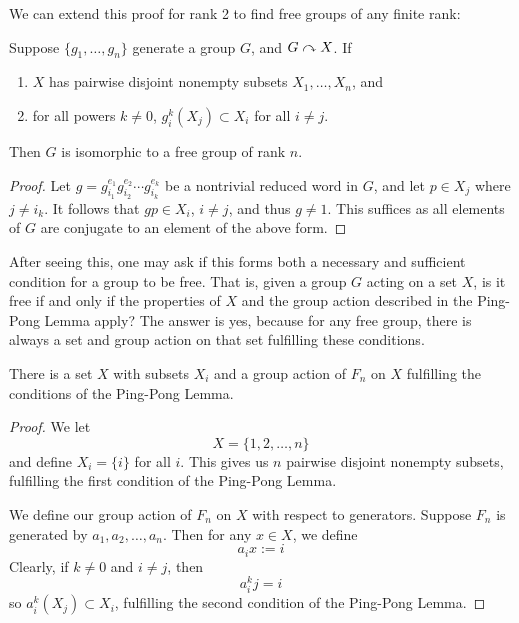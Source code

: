 We can extend this proof for rank 2 to find free groups of any finite rank:

\begin{thm}\label{Ping Pong for n Players}
    Suppose $\{g_1, \ldots, g_n\}$ generate a group $G$, and $G \curvearrowright X$. If 
    \begin{enumerate}
        \item $X$ has pairwise disjoint nonempty subsets $X_1, \ldots, X_n$, and 
        \item for all powers $k \neq 0$, $g_i^k(X_j) \subset X_i$ for all $i \neq j$.
    \end{enumerate}
    Then $G$ is isomorphic to a free group of rank $n$. 
\end{thm}

\begin{proof}
    Let $g = g_{i_1}^{e_1}g_{i_2}^{e_2}\cdots g_{i_k}^{e_k}$ be a nontrivial reduced word in $G$, and let $p \in X_j$ where $j \neq i_k$. It follows that $gp \in X_i$, $i \neq j$, and thus $g \neq 1$. This suffices as all elements of $G$ are conjugate to an element of the above form.  
\end{proof}

After seeing this, one may ask if this forms both a necessary and sufficient condition for a group to be free. That is, given a group $G$ acting on a set $X$, is it free if and only if the properties of $X$ and the group action described in the Ping-Pong Lemma apply? The answer is yes, because for any free group, there is always a set and group action on that set fulfilling these conditions.

\begin{thm}\label{Free Groups Satisfy Ping Pong}
    There is a set $X$ with subsets $X_i$ and a group action of $F_n$ on $X$ fulfilling the conditions of the Ping-Pong Lemma. 
\end{thm}

\begin{proof}
    We let
    \[X = \{1,2,\ldots,n\}\]
    and define $X_i = \{i\}$ for all $i$. This gives us $n$ pairwise disjoint nonempty subsets, fulfilling the first condition of the Ping-Pong Lemma.

    We define our group action of $F_n$ on $X$ with respect to generators. Suppose $F_n$ is generated by $a_1, a_2, \ldots, a_n$. Then for any $x \in X$, we define 
    \[a_ix := i\]
    Clearly, if $k \neq 0$ and $i \neq j$, then 
    \[a_i^kj = i\]
    so $a_i^k(X_j) \subset X_i$, fulfilling the second condition of the Ping-Pong Lemma. 
\end{proof}

